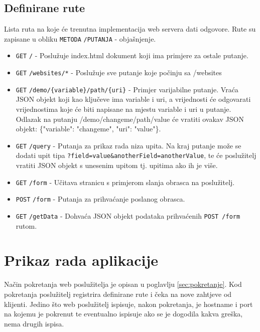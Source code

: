 \documentclass[]{foi}
\begin{document}
\subsection{Definirane rute} \label{sec:rute}

Lista ruta na koje će trenutna implementacija web servera dati odgovore.
Rute su zapisane u obliku \texttt{METODA} \texttt{/PUTANJA} - objašnjenje.
\begin{itemize}
	\item \texttt{GET} \texttt{/} - Poslužuje index.html dokument koji ima primjere
	      za ostale putanje.
	\item \texttt{GET} \texttt{/websites/*} - Poslužuje sve putanje koje počinju sa /websites
	\item \texttt{GET} \texttt{/demo/\{variable\}/path/\{uri\}} - Primjer varijabilne putanje.
	      Vraća JSON objekt koji kao ključeve ima variable i uri, a vrijednosti će odgovarati
	      vrijednostima koje će biti napisane na mjestu variable i uri u putanje. Odlazak na
	      putanju /demo/changeme/path/value će vratiti ovakav JSON objekt: \{"variable": "changeme", "uri": "value"\}.
	\item \texttt{GET} \texttt{/query} - Putanja za prikaz rada niza upita. Na kraj putanje može
	      se dodati upit tipa \texttt{?field=value\&anotherField=anotherValue}, te će poslužitelj
	      vratiti JSON objekt s unesenim upitom tj. upitima ako ih je više.
	\item \texttt{GET} \texttt{/form} - Učitava stranicu s primjerom slanja obrasca na poslužitelj.
	\item \texttt{POST} \texttt{/form} - Putanja za prihvaćanje poslanog obrasca.
	\item \texttt{GET} \texttt{/getData} - Dohvaća JSON objekt podataka prihvaćenih \texttt{POST /form} rutom.
\end{itemize}

\section{Prikaz rada aplikacije}

Način pokretanja web poslužitelja je opisan u poglavlju \ref{sec:pokretanje}. Kod pokretanja
poslužitelj registrira definirane rute i čeka na nove zahtjeve od klijenti. Jedino što
web poslužitelj ispisuje, nakon pokretanja, je hostname i port na kojemu je pokrenut te
eventualno ispisuje ako se je dogodila kakva greška, nema drugih ispisa.
\end{document}
